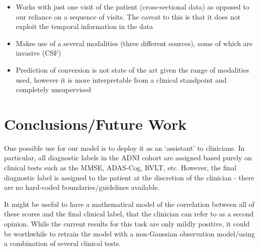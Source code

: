 \documentclass[12pt,a4paper]{article}
\begin{document}
\begin{itemize}
\item Works with just one visit of the patient (cross-sectional data)
  as opposed to our reliance on a sequence of visits. The caveat to
  this is that it does not exploit the temporal information in the data
\item Makes use of a several modalities (three different sources),
  some of which are invasive (CSF)
\item Prediction of conversion is not state of the art given the range
  of modalities used, however it is more interpretable from a clinical
  standpoint and completely unsupervised
\end{itemize}

\section{Conclusions/Future Work}

One possible use for our model is to deploy it as an `assistant' to
clinicians. In particular, all diagnostic labels in the ADNI cohort
are assigned based purely on clinical tests such as the MMSE,
ADAS-Cog, RVLT, etc. However, the final diagnostic label is assigned to
the patient at the discretion of the clinician - there are no
hard-coded boundaries/guidelines available. 

It might be useful to have a mathematical model of the correlation
between all of these scores and the final clinical label, that the
clinician can refer to as a second opinion. While the current results
for this task are only mildly positive, it could be worthwhile to
retrain the model with a non-Gaussian observation model/using a
combination of several clinical tests.
\end{document}
